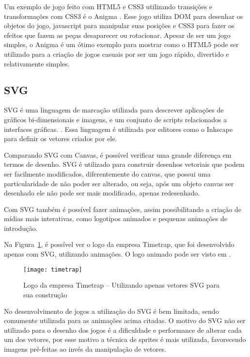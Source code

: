 Um exemplo de jogo feito com HTML5 e CSS3 utilizando transições e
transformações com CSS3 é o Anigma \cite{website:anigma}. Esse jogo
utiliza DOM para desenhar os objetos do jogo, javascript para
manipular suas posições e CSS3 para fazer os efeitos que fazem as
peças desaparecer ou rotacionar. Apesar de ser um jogo simples, o
Anigma é um ótimo exemplo para mostrar como o HTML5 pode ser utilizado
para a criação de jogos casuais por ser um jogo rápido, divertido e
relativamente simples.

\subsection{SVG}

SVG é uma linguagem de marcação utilizada para descrever aplicações de gráficos
bi-dimensionais e imagens, e um conjunto de scripts relacionados a
interfaces gráficas. \cite{website:w3csvg}. Essa linguagem é utilizada por
editores como o Inkscape para definir os vetores criados por ele.

Comparando SVG com Canvas, é possível verificar uma grande diferença
em termos de desenho. SVG é utilizado para construir desenhos
vetoriais que podem ser facilmente modificados, diferentemente do
canvas, que possui uma particularidade de não poder ser alterado, ou
seja, após um objeto canvas ser desenhado ele não pode ser mais
modificado, apenas redesenhado.

Com SVG também é possível fazer animações, assim possibilitando a
criação de mídias mais interativas, como logotipos animados e pequenas
animações de introdução.

Na Figura~\ref{img:timetrap}, é possível ver o logo da empresa
Timetrap, que foi desenvolvido apenas com SVG, utilizando animações. O
logo animado pode ser visto em .

\begin{figure}[H]
  \centering
	\texttt{[image: timetrap]}
  \caption{Logo da empresa Timetrap {--} Utilizando apenas vetores SVG para sua construção}
  \label{img:timetrap}
\end{figure}

No desenvolvimento de jogos a utilização do SVG é bem limitada, sendo
comumente utilizada para as animações acima citadas. O motivo do SVG
não ser utilizado para o desenho dos jogos é a dificuldade e
performance de alterar cada um dos vetores, por esse motivo
a técnica de sprites é mais utilizada, favorecendo imagens pré-feitas
ao invés da manipulação de vetores.


